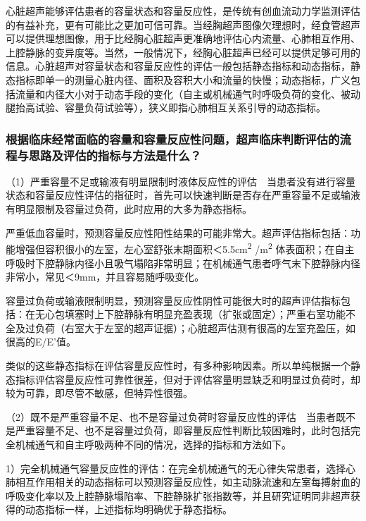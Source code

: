 心脏超声能够评估患者的容量状态和容量反应性，是传统有创血流动力学监测评估的有益补充，更有可能比之更加可信可靠。当经胸超声图像欠理想时，经食管超声可以提供理想图像，用于比经胸心脏超声更准确地评估心内流量、心肺相互作用、上腔静脉的变异度等。当然，一般情况下，经胸心脏超声已经可以提供足够可用的信息。心脏超声对容量状态和容量反应性的评估一般包括静态指标和动态指标，静态指标即单一的测量心脏内径、面积及容积大小和流量的快慢；动态指标，广义包括流量和内径大小对于动态手段的变化（自主或机械通气时呼吸负荷的变化、被动腿抬高试验、容量负荷试验等），狭义即指心肺相互关系引导的动态指标。

\subsubsection{根据临床经常面临的容量和容量反应性问题，超声临床判断评估的流程与思路及评估的指标与方法是什么？}

（1）严重容量不足或输液有明显限制时液体反应性的评估　当患者没有进行容量状态和容量反应性评估的指征时，首先可以快速判断是否存在严重容量不足或输液有明显限制及容量过负荷，此时应用的大多为静态指标。

严重低血容量时，预测容量反应性阳性结果的可能非常大。超声评估指标包括：功能增强但容积很小的左室，左心室舒张末期面积＜5.5cm\textsuperscript{2}
/m\textsuperscript{2}
体表面积；在自主呼吸时下腔静脉内径小且吸气塌陷非常明显；在机械通气患者呼气末下腔静脉内径非常小，常见＜9mm，并且容易随呼吸变化。

容量过负荷或输液限制明显，预测容量反应性阴性可能很大时的超声评估指标包括：在无心包填塞时上下腔静脉有明显充盈表现（扩张或固定）；严重右室功能不全及过负荷（右室大于左室的超声证据）；心脏超声估测有很高的左室充盈压，如很高的E/E'值。

类似的这些静态指标在评估容量反应性时，有多种影响因素。所以单纯根据一个静态指标评估容量反应性可靠性很差，但对于评估容量明显缺乏和明显过负荷时，却较为可靠，即尽管不敏感，但特异性很强。

（2）既不是严重容量不足、也不是容量过负荷时容量反应性的评估　当患者既不是严重容量不足、也不是容量过负荷，即容量反应性判断比较困难时，此时包括完全机械通气和自主呼吸两种不同的情况，选择的指标和方法如下。

1）完全机械通气容量反应性的评估：在完全机械通气的无心律失常患者，选择心肺相互作用相关的动态指标可以预测容量反应性，如主动脉流速和左室每搏射血的呼吸变化率以及上腔静脉塌陷率、下腔静脉扩张指数等，并且研究证明同非超声获得的动态指标一样，上述指标均明确优于静态指标。

